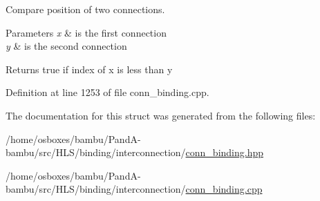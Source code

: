 Compare position of two connections. 


\begin{DoxyParams}{Parameters}
{\em x} & is the first connection \\
\hline
{\em y} & is the second connection \\
\hline
\end{DoxyParams}
\begin{DoxyReturn}{Returns}
true if index of x is less than y 
\end{DoxyReturn}


Definition at line 1253 of file conn\+\_\+binding.\+cpp.



The documentation for this struct was generated from the following files\+:\begin{DoxyCompactItemize}
\item 
/home/osboxes/bambu/\+Pand\+A-\/bambu/src/\+H\+L\+S/binding/interconnection/\hyperlink{conn__binding_8hpp}{conn\+\_\+binding.\+hpp}\item 
/home/osboxes/bambu/\+Pand\+A-\/bambu/src/\+H\+L\+S/binding/interconnection/\hyperlink{conn__binding_8cpp}{conn\+\_\+binding.\+cpp}\end{DoxyCompactItemize}
